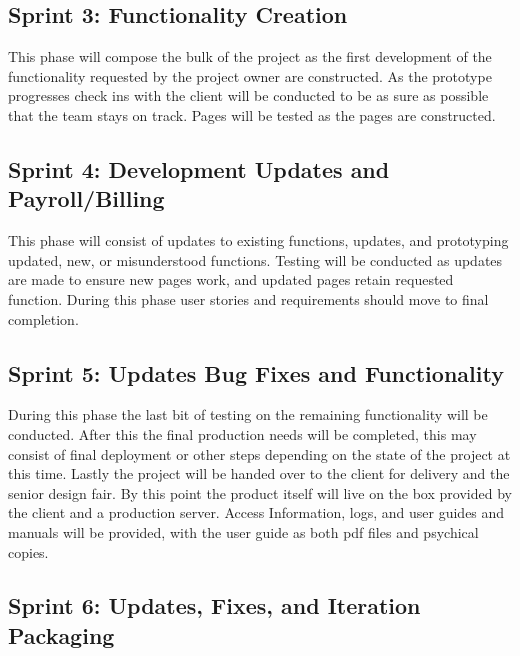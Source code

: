 \subsection{Sprint 3: Functionality Creation }
This phase will compose the bulk of the project as the first development of the functionality requested by the project owner are constructed. As the prototype progresses check ins with the client will be conducted to be as sure as possible that the team stays on track. Pages will be tested as the pages are constructed.

\subsection{Sprint 4: Development Updates and Payroll/Billing}
This phase will consist of updates to existing functions, updates, and prototyping updated, new, or misunderstood functions. Testing will be conducted as updates are made to ensure new pages work, and updated pages retain requested function. During this phase user stories and requirements should move to final completion.

\subsection{Sprint 5: Updates Bug Fixes and Functionality}
During this phase the last bit of testing on the remaining functionality will be conducted. After this the final production needs will be completed, this may consist of final deployment or other steps depending on the state of the project at this time. Lastly the project will be handed over to the client for delivery and the senior design fair. By this point the product itself will live on the box provided by the client and a production server. Access Information, logs, and user guides and manuals will be provided, with the user guide as both pdf files and psychical copies.

\subsection{Sprint 6: Updates, Fixes, and Iteration Packaging}



